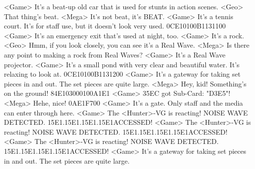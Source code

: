 <Game> It's a beat-up old car that is used for stunts in action scenes. 
<Geo> That thing's beat. 
<Mega> It's not beat, it's BEAT. 
<Game> It's a tennis court. It's for staff use, but it doesn't look very used. 
{0C}{E1}{01}{00}{B1}{13}{11}{00}
<Game> It's an emergency exit that's used at night, too. 
<Game> It's a rock. 
<Geo> Hmm, if you look closely, you can see it's a Real Wave. 
<Mega> Is there any point to making a rock from Real Waves? 
<Game> It's a Real Wave projector. 
<Game> It's a small pond with very clear and beautiful water. It's relaxing to look at. 
{0C}{E1}{01}{00}{B1}{13}{12}{00}
<Game> It's a gateway for taking set pieces in and out. The set pieces are quite large. 
<Mega> Hey, kid! Something's on the ground! 
{84}{E1}{03}{00}{01}{00}{A1}{E1} 
<Game> {35}{EC} got Sub-Card: "{D3}{E5}"! 
<Mega> Hehe, nice! 
{0A}{E1}{F7}{00}
<Game> It's a gate. Only staff and the media can enter through here. 
<Game> The <Hunter>-VG is reacting! 
NOISE WAVE DETECTED. {15}{E1}.{15}{E1}.{15}{E1}.{15}{E1}ACCESSED! 
<Game> The <Hunter>-VG is reacting! 
NOISE WAVE DETECTED. {15}{E1}.{15}{E1}.{15}{E1}.{15}{E1}ACCESSED! 
<Game> The <Hunter>-VG is reacting! 
NOISE WAVE DETECTED. {15}{E1}.{15}{E1}.{15}{E1}.{15}{E1}ACCESSED! 
<Game> It's a gateway for taking set pieces in and out. The set pieces are quite large. 
